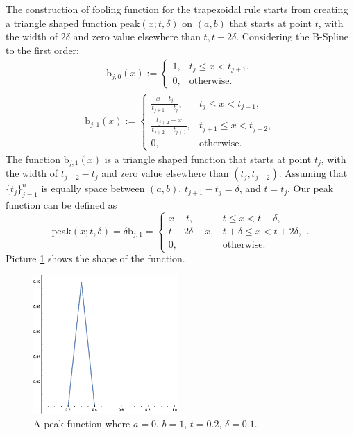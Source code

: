 \documentclass{iitthesis}
\theoremstyle{definition}
\theoremstyle{remark}
\begin{document}
The construction of fooling function for the trapezoidal rule starts from creating a triangle shaped function $\text{peak}(x;t,\delta)$ on $(a,b)$ that starts at point $t$, with the width of $2\delta$ and zero value elsewhere than $t, t+2\delta$. Considering the B-Spline to the first order:
\begin{align*}
  \text{b}_{j,0}(x):= \begin{cases} \displaystyle 1, & t_{j} \le x < t_{j+1},\\[1ex]
\displaystyle  0, & \text{otherwise}.
\end{cases}
\end{align*}
\begin{align*}
  \text{b}_{j,1}(x):= \begin{cases} \displaystyle \frac{x-t_{j}}{t_{j+1}-t_{j}}, & t_{j} \le x < t_{j+1},\\[1ex]
\displaystyle \frac{t_{j+2}-x}{t_{j+2}-t_{j+1}}, & t_{j+1} \le x < t_{j+2},\\[1ex]
\displaystyle  0, & \text{otherwise}.
\end{cases}
\end{align*}
The function $\text{b}_{j,1}(x)$ is a triangle shaped function that starts at point $t_j$, with the width of $t_{j+2}-t_{j}$ and zero value elsewhere than $(t_{j}, t_{j+2})$. Assuming that $\{t_{j}\}_{j=1}^{n}$ is equally space between $(a,b)$, $t_{j+1}-t_{j}=\delta$, and $t=t_{j}$. Our peak function can be defined as
\begin{equation}\label{peakfunction}
  \text{peak}(x;t,\delta)=\delta \text{b}_{j,1}=\begin{cases} \displaystyle x-t, & t \le x < t+\delta,\\[1ex]
\displaystyle t+2\delta-x, & t+\delta \le x < t+2\delta,\\[1ex]
\displaystyle  0, & \text{otherwise}.
\end{cases}.
\end{equation}
Picture \ref{fig:peakfunction} shows the shape of the function.
\begin{figure}[ht]
\centering
\includegraphics[width=5.5cm]{peak.eps}
\caption{A peak function where $a=0$, $b=1$, $t=0.2$, $\delta=0.1$. \label{fig:peakfunction}}
\end{figure}
\end{document}

